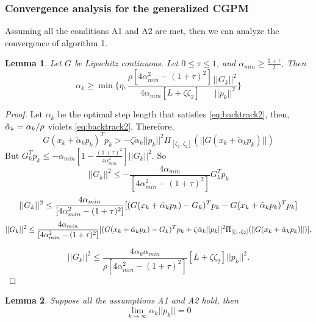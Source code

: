 \documentclass{article}
\newtheorem{lemma}{Lemma}
\theoremstyle{remark}
\begin{document}
{\subsubsection{Convergence analysis for the generalized CGPM}
\label{Convergence GCGPM}

{Assuming all the conditions A1 and A2 are met, then we can analyze the convergence of algorithm 1.
\begin{lemma}
    Let $G$ be Lipschitz continuous. Let  $0\leq \tau\leq 1$, and $\alpha_{min} \geq \frac{1+\tau}{2}$, Then 
    \[
    \alpha_k\geq \min\{\eta, \frac{\rho[4\alpha_{min}^2-(1+\tau)^2]}{4\alpha_{min}[L+\zeta\zeta_2]}\frac{||G_k||^2}{||p_k||^2}\}
    \]
\end{lemma}
\begin{proof}
   Let $\alpha_k$ be the optimal step length that satisfies \eqref{eq:backtrack2}, then, $\Tilde{\alpha}_k = \alpha_k/\rho $ violets \eqref{eq:backtrack2}. Therefore, 
\[
G(x_k+\tilde{\alpha}_kp_k)^Tp_k>- \zeta \tilde{\alpha}_k||p_k||^2\Pi_{[\zeta_1, \zeta_2]}(||G(x_k+\tilde{\alpha}_kp_k)||)
\]
But $G_k^Tp_k\leq -\alpha_{min}[1-\frac{(1+\tau)^2}{4\alpha_{min}^2}]||G_k||^2$. So
\[
||G_k||^2\leq -\frac{4\alpha_{min}}{[4\alpha_{min}^2-(1+\tau)^2]}G_k^Tp_k
\]
\[
||G_k||^2\leq \frac{4\alpha_{min}}{\left[4\alpha_{min}^2-(1+\tau)^2\right]}[(G(x_k+\Tilde{\alpha}_kp_k)- G_k)^Tp_k-G(x_k+\Tilde{\alpha}_kp_k)^Tp_k]
\]
\[
||G_k||^2\leq \frac{4\alpha_{min}}{\left[4\alpha_{min}^2-(1+\tau)^2\right]}[(G(x_k+\Tilde{\alpha}_kp_k)- G_k)^Tp_k+\zeta \tilde{\alpha}_k||p_k||^2\Pi_{[\zeta_1, \zeta_2]}(\|G(x_k+\tilde{\alpha}_kp_k)\|)],
\]

\[
||G_k||^2\leq \frac{4\alpha_k\alpha_{min}}{\rho[4\alpha_{min}^2-(1+\tau)^2]}[L+\zeta\zeta_2]||p_k||^2.
\]

\end{proof}
\begin{lemma}
\label{lemmacgpm}
    Suppose all the assumptions A1 and A2 hold, then \[\lim_{k\rightarrow \infty}\alpha_k||p_k||=0\]
\end{lemma}
    
}}
\end{document}
